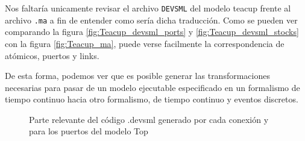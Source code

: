 Nos faltaría unicamente revisar el archivo \texttt{DEVSML} del modelo teacup frente al archivo \texttt{.ma} a fin de entender como sería dicha traducción. Como se pueden ver comparando la figura \ref{fig:Teacup_devsml_ports} y \ref{fig:Teacup_devsml_stocks} con la figura \ref{fig:Teacup_ma}, puede verse facilmente la correspondencia de atómicos, puertos y links.

De esta forma, podemos ver que es posible generar las transformaciones necesarias para pasar de un modelo ejecutable especificado en un formalismo de tiempo continuo hacia otro formalismo, de tiempo continuo y eventos discretos.

\begin{figure}[!h]
	\centering     %
	\caption{Parte relevante del código .devsml generado por cada conexión y para los puertos del modelo Top}
\end{figure}


